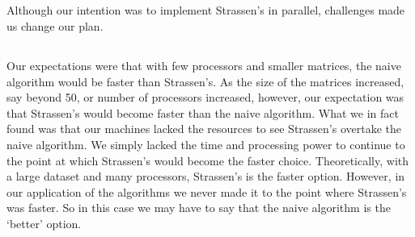 \documentclass[11pt,twocolumn]{article}
\begin{document}
\subsection{}
Although our intention was to implement Strassen's in parallel, challenges made us
change our plan.

\subsection{}
Our expectations were that with few processors and smaller matrices, the naive algorithm 
would be faster than Strassen’s. As the size of the matrices increased, say beyond 50, or 
number of processors increased, however, our expectation was that Strassen’s would become 
faster than the naive algorithm. What we in fact found was that our machines lacked the 
resources to see Strassen’s overtake the naive algorithm. We simply lacked the time and 
processing power to continue to the point at which Strassen’s would become the faster 
choice. Theoretically, with a large dataset and many processors, Strassen’s is the faster 
option. However, in our application of the algorithms we never made it to the point where 
Strassen’s was faster. So in this case we may have to say that the naive algorithm is 
the ‘better’ option.
\end{document}

